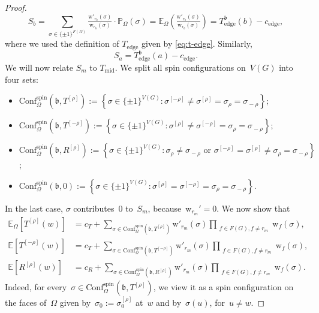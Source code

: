 \documentclass[reqno,11pt,a4paper]{amsart}
\theoremstyle{remark}
\newcommand{\bbE}{\mathbb{E}}
\newcommand{\bbP}{\mathbb{P}}
\newcommand{\Te}{T_{\mathrm{edge}}}       \newcommand{\Ce}{c_{\mathrm{edge}}}
\newcommand{\Tm}{T_{\mathrm{mid}}}        \newcommand{\Cm}{c_{\mathrm{mid}}}
\newcommand{\CmT}{c_T}
\newcommand{\CmR}{c_R}
\newcommand{\Trho}{T^{[\rho]}}
\newcommand{\Rrho}{R^{[\rho]}}
\newcommand{\Tmrho}{T^{\left[-\rho \right]}}
\renewcommand{\b}{\mathfrak{b}}
\newcommand{\seOne}{\sigma_{\rho}}
\newcommand{\seFour}{\sigma_{\!-\rho}}
\newcommand{\weight}{\mathrm{w}}
\newcommand{\conf}{\mathrm{Conf}}
\newcommand\ConfOs[1]{\conf^{\mathrm{spin}}_\Omega(#1)}
\begin{document}
\begin{proof}
	\begin{equation}\label{eq:rel-proof-Tb}
		S_{b} = \sum_{\sigma\in \{\pm 1\}^{F(\Omega)}}\tfrac{\weight'_{r_{b}}(\sigma)}{\weight_{r_{b}}(\sigma)} \cdot \bbP_{\Omega}(\sigma) 
		= \bbE_{\Omega}\left( \tfrac{\weight'_{r_{b}}(\sigma)}{\weight_{r_{b}}(\sigma)} \right) = \Te^{\b}(b) - \Ce,
	\end{equation}
	where we used the definition of $\Te$ given by \eqref{eq:t-edge}. Similarly,
	\begin{equation}\label{eq:rel-proof-Ta}
		S_{a} = \Te^{\b}(a) - \Ce.
	\end{equation}
	We will now relate $S_{m}$ to $\Tm$.
	We split all spin configurations on~$V(G)$ into four sets: 
	\begin{itemize}
		\item $\ConfOs{\b,\Trho}:=\left\{ \sigma\in\{\pm 1\}^{V(G)} \colon \sigma^{[-\rho]} \neq \sigma^{[\rho]} = \seOne = \seFour\right\}$;
		\item $\ConfOs{\b,\Tmrho}:= \left\{\sigma\in\{\pm 1\}^{V(G)} \colon \sigma^{[\rho]} \neq \sigma^{[-\rho]} = \seOne = \seFour\right\}$;
		\item $\ConfOs{\b,\Rrho}:= \left\{\sigma\in\{\pm 1\}^{V(G)} \colon \seOne \neq \seFour \,\, \text{or} \,\, \sigma^{[-\rho]} = \sigma^{[\rho]} \neq \seOne = \seFour\right\}$;
		\item $\ConfOs{\b, 0}:= \left\{\sigma\in\{\pm 1\}^{V(G)} \colon \sigma^{[\rho]} = \sigma^{[-\rho]} =\seOne = \seFour\right\}$.
	\end{itemize}
	In the last case, $\sigma$ contributes~$0$ to~$S_m$, because~$\weight_{r_m}'=0$.
	We now show that
	\begin{align}
		\bbE_{\Omega}[\Trho(w)] &= \CmT + \sum_{\sigma\in \ConfOs{\b,\Trho}}\weight'_{r_{m}}(\sigma) \prod_{\substack{f\in F(G), f\neq r_{m}}} \weight_{f}(\sigma), \label{eq:trho-via-double-spin}\\
		\bbE[\Tmrho(w)] &= \CmT + \sum_{\sigma\in \ConfOs{\b,\Tmrho}}\weight'_{r_{m}}(\sigma) \prod_{\substack{f\in F(G), f\neq r_{m}}} \weight_{f}(\sigma),\label{eq:tmrho-via-double-spin}\\
		\bbE[\Rrho(w)] &= \CmR + \sum_{\sigma\in \ConfOs{\b,\Rrho}}\weight'_{r_{m}}(\sigma) \prod_{\substack{f\in F(G), f\neq r_{m}}} \weight_{f}(\sigma).\label{eq:rrho-via-double-spin}
	\end{align}
	Indeed, for every~$\sigma\in \ConfOs{\b,\Trho}$, we view it as a spin configuration on the faces of~$\Omega$ given by~$\sigma_0:= \sigma_0^{[\rho]}$ at~$w$ and by~$\sigma(u)$, for~$u\neq w$.

\end{proof}
\end{document}
